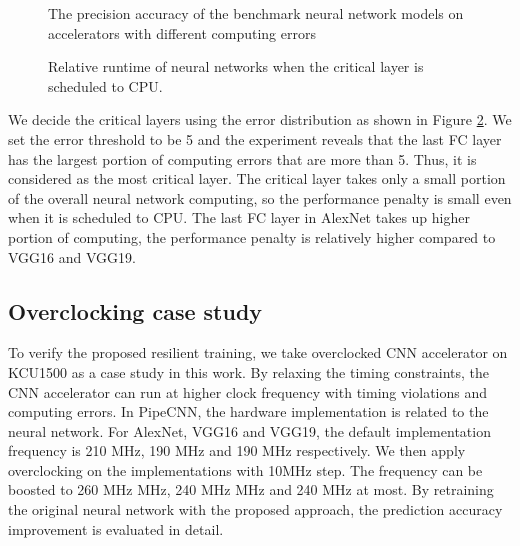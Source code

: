 \begin{figure}
        \center
        \qquad
        \qquad
        \caption{The precision accuracy of the benchmark neural network models on accelerators with different computing errors}
        \label{fig:softerror-accuracy}
\end{figure}

\begin{figure}
        \caption{Relative runtime of neural networks when the critical layer is scheduled to CPU.}
        \label{fig:clp_perf}
\end{figure}

We decide the critical layers using the error distribution as shown in Figure \ref{fig:clp_perf}.
We set the error threshold to be 5 and the experiment reveals that the last FC 
layer has the largest portion of computing errors that are more than 5. Thus, it is considered as 
the most critical layer. The critical layer takes only a small portion of the overall 
neural network computing, so the performance penalty is small even 
when it is scheduled to CPU. The last FC layer in AlexNet takes up higher portion of computing, 
the performance penalty is relatively higher compared to VGG16 and VGG19.
\begin{figure*}
        \caption{Error distribution across the neural network layers when highest BER is used in AlexNet, VGG16 and VGG19.}
        \label{fig:clp_perf}
\end{figure*}

\subsection{Overclocking case study}
To verify the proposed resilient training, we take overclocked CNN accelerator on KCU1500 as a case 
study in this work. By relaxing the timing constraints, the CNN accelerator can 
run at higher clock frequency with timing violations and computing errors. In PipeCNN, the 
hardware implementation is related to the neural network. For AlexNet, VGG16 and VGG19, the 
default implementation frequency is 210 MHz, 190 MHz and 190 MHz respectively. We then apply overclocking 
on the implementations with 10MHz step. The frequency can be boosted to 
260 MHz MHz, 240 MHz MHz and 240 MHz at most. By retraining the original neural network with 
the proposed approach, the prediction accuracy improvement is evaluated in detail.


